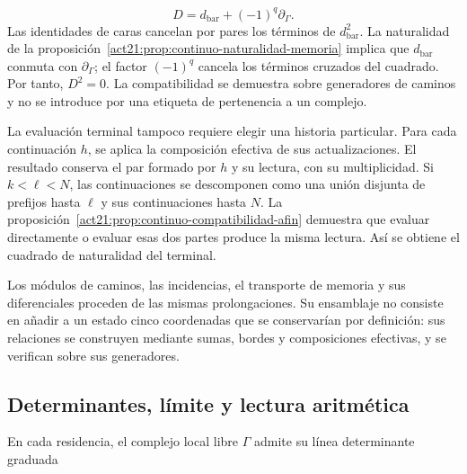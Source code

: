 \[
D=d_{\mathrm{bar}}+(-1)^q\partial_\Gamma.
\]
Las identidades de caras cancelan por pares los términos de \(d_{\mathrm{bar}}^2\). La naturalidad de la proposición~\ref{act21:prop:continuo-naturalidad-memoria} implica que \(d_{\mathrm{bar}}\) conmuta con \(\partial_\Gamma\); el factor \((-1)^q\) cancela los términos cruzados del cuadrado. Por tanto, \(D^2=0\). La compatibilidad se demuestra sobre generadores de caminos y no se introduce por una etiqueta de pertenencia a un complejo.

La evaluación terminal tampoco requiere elegir una historia particular. Para cada continuación \(h\), se aplica la composición efectiva de sus actualizaciones. El resultado conserva el par formado por \(h\) y su lectura, con su multiplicidad. Si \(k<\ell<N\), las continuaciones se descomponen como una unión disjunta de prefijos hasta \(\ell\) y sus continuaciones hasta \(N\). La proposición~\ref{act21:prop:continuo-compatibilidad-afin} demuestra que evaluar directamente o evaluar esas dos partes produce la misma lectura. Así se obtiene el cuadrado de naturalidad del terminal.

Los módulos de caminos, las incidencias, el transporte de memoria y sus diferenciales proceden de las mismas prolongaciones. Su ensamblaje no consiste en añadir a un estado cinco coordenadas que se conservarían por definición: sus relaciones se construyen mediante sumas, bordes y composiciones efectivas, y se verifican sobre sus generadores.

\subsection{Determinantes, límite y lectura aritmética}
En cada residencia, el complejo local libre \(\Gamma\) admite su línea determinante graduada


